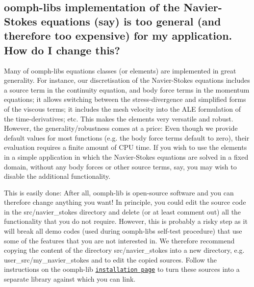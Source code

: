 ~\newline
~\newline
 



~\newline
~\newline
 \hypertarget{index_element_too_general}{}\subsection{oomph-\/lib\textquotesingle{}s implementation of the Navier-\/\+Stokes equations (say) is too general (and therefore too expensive) for my application. How do I change this?}\label{index_element_too_general}
Many of {\ttfamily oomph-\/lib\textquotesingle{}s} equations classes (or elements) are implemented in great generality. For instance, our discretisation of the Navier-\/\+Stokes equations includes a source term in the continuity equation, and body force terms in the momentum equations; it allows switching between the stress-\/divergence and simplified forms of the viscous terms; it includes the mesh velocity into the A\+LE formulation of the time-\/derivatives; etc. This makes the elements very versatile and robust. However, the generality/robustness comes at a price\+: Even though we provide default values for most functions (e.\+g. the body force terms default to zero), their evaluation requires a finite amount of C\+PU time. If you wish to use the elements in a simple application in which the Navier-\/\+Stokes equations are solved in a fixed domain, without any body forces or other source terms, say, you may wish to disable the additional functionality.

This is easily done\+: After all, {\ttfamily oomph-\/lib} is open-\/source software and you can therefore change anything you want! In principle, you could edit the source code in the {\ttfamily src/navier\+\_\+stokes} directory and delete (or at least comment out) all the functionality that you do not require. However, this is probably a risky step as it will break all demo codes (used during {\ttfamily oomph-\/lib\textquotesingle{}s} self-\/test procedure) that use some of the features that you are not interested in. We therefore recommend copying the content of the directory {\ttfamily src/navier\+\_\+stokes} into a new directory, e.\+g. {\ttfamily user\+\_\+src/my\+\_\+navier\+\_\+stokes} and to edit the copied sources. Follow the instructions on the {\ttfamily oomph-\/lib} \href{../../the_distribution/html/index.html#add_src}{\tt installation page} to turn these sources into a separate library against which you can link.

